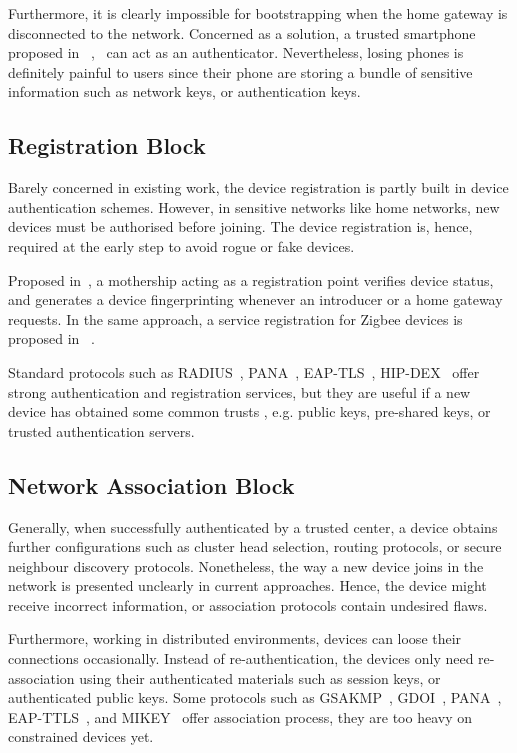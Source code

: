 Furthermore, it is clearly impossible for bootstrapping when the home gateway is disconnected to the network. Concerned as a solution, a trusted smartphone proposed in ~\cite{Seung2015},~\cite{6934398} can act as an authenticator. Nevertheless, losing phones is definitely painful to users since their phone are storing a bundle of sensitive information such as network keys, or authentication keys. 

\subsection{Registration Block}
Barely concerned in existing work, the device registration is partly built in device authentication schemes. However, in sensitive networks like home networks, new devices must be authorised before joining. The device registration is, hence, required at the early step to avoid rogue or fake devices. 

Proposed in~\cite{Jeanning2013}, a mothership acting as a registration point verifies device status, and generates a device fingerprinting whenever an introducer or a home gateway requests. In the same approach, a service registration for Zigbee devices is proposed in ~\cite{5174409}.

Standard protocols such as RADIUS~\cite{RADIUS}, PANA~\cite{rfc5191, Sarikaya2015}, EAP-TLS~\cite{eaptls}, HIP-DEX~\cite{hipdex} offer strong authentication and registration services, but they are useful if a new device has obtained some common trusts , e.g. public keys, pre-shared keys, or trusted authentication servers.

\subsection{Network Association Block}
Generally, when successfully authenticated by a trusted center, a device obtains further configurations such as cluster head selection, routing protocols, or secure neighbour discovery protocols. Nonetheless, the way a new device joins in the network is presented unclearly in current approaches. Hence, the device might receive incorrect information, or association protocols contain undesired flaws. 

Furthermore, working in distributed environments, devices can loose their connections occasionally. Instead of re-authentication, the devices only need re-association using their authenticated materials such as session keys, or authenticated public keys. Some protocols such as GSAKMP~\cite{gsakmp}, GDOI~\cite{gdoi}, PANA~\cite{rfc5191}, EAP-TTLS~\cite{EAP-TTLSv0}, and MIKEY~\cite{MIKEY} offer association process, they are too heavy on constrained devices yet. 


